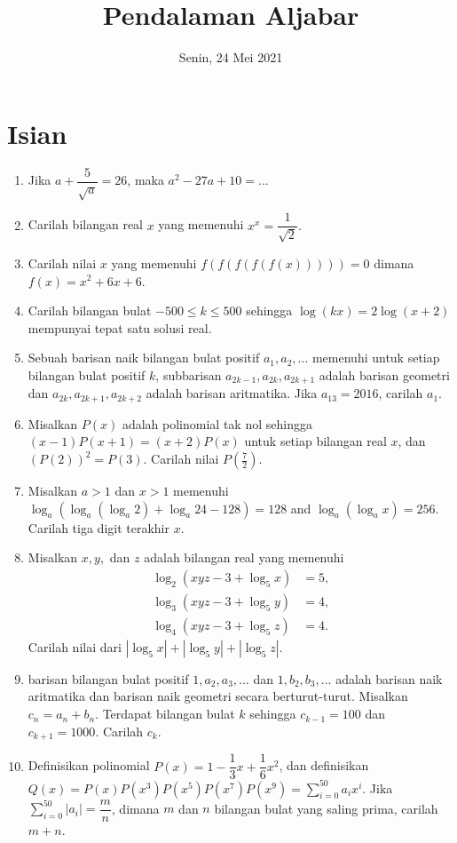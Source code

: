 \documentclass[12pt]{scrartcl}
\title{Pendalaman Aljabar}
\author{}
\date{Senin, 24 Mei 2021}
\begin{document}
	\maketitle

\renewcommand*\contentsname{Daftar Isi}
\tableofcontents

\newpage
	
	\section{Isian}
	\begin{enumerate}
		\item Jika $a+\dfrac{5}{\sqrt{a}}=26$, maka  $a^2-27a+10=...$
		
		\item Carilah bilangan real $x$ yang memenuhi $x^x = \dfrac{1}{\sqrt{2}}.$
		
		\item Carilah nilai $x$ yang memenuhi $f(f(f(f(f(x)))))=0$ dimana $f(x)=x^2+6x+6$.
		
		\item Carilah bilangan bulat $-500\le k \le 500$ sehingga $\log(kx)=2\log(x+2)$ mempunyai tepat satu solusi real.
		
		\item Sebuah barisan naik bilangan bulat positif $a_1, a_2, \dots$ memenuhi untuk setiap bilangan bulat positif $k$, subbarisan $a_{2k-1},a_{2k},a_{2k+1}$ adalah barisan geometri dan $a_{2k},a_{2k+1},a_{2k+2}$ adalah barisan aritmatika. Jika $a_{13}=2016$, carilah $a_1$.
		
		\item Misalkan $P(x)$ adalah polinomial tak nol sehingga $(x-1)P(x+1)=(x+2)P(x)$ untuk setiap bilangan real $x$, dan $(P(2))^2 = P(3)$. Carilah nilai $P(\frac{7}{2})$.
		
		\item Misalkan $a > 1$ dan $x > 1$ memenuhi $\log_a(\log_a(\log_a 2) + \log_a 24 - 128) = 128$ and $\log_a(\log_a x) = 256$. Carilah tiga digit terakhir $x$.
		
		\item Misalkan $x,y,$ dan $z$ adalah bilangan real yang memenuhi
		\begin{align*} \log_2(xyz-3+\log_5 x)&=5,\\ \log_3(xyz-3+\log_5 y)&=4,\\ \log_4(xyz-3+\log_5 z)&=4. 
		\end{align*}Carilah nilai dari $|\log_5 x|+|\log_5 y|+|\log_5 z|$.
	
		\item barisan bilangan bulat positif $1,a_2, a_3,...$ dan $1,b_2, b_3,...$ adalah barisan naik aritmatika dan barisan naik geometri secara berturut-turut. Misalkan $c_n=a_n+b_n$. Terdapat bilangan bulat $k$ sehingga $c_{k-1}=100$ dan $c_{k+1}=1000$. Carilah $c_k$.
		
		\item Definisikan polinomial $P(x)=1-\dfrac{1}{3}x+\dfrac{1}{6}x^{2}$, dan definisikan $Q(x)=P(x)P(x^{3})P(x^{5})P(x^{7})P(x^{9})=\sum_{i=0}^{50} a_ix^{i}$. Jika $\sum_{i=0}^{50} |a_i|=\dfrac{m}{n}$, dimana $m$ dan $n$ bilangan bulat yang saling prima, carilah $m+n$.
	\end{enumerate}
\end{document}
